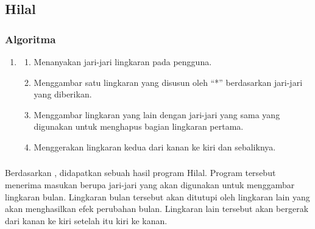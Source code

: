 \documentclass[../main.tex]{subfiles}
\begin{document}
    \subsection{Hilal}
    \subsubsection{Algoritma}
    \begin{enumerate}
        \item[]
        \begin{enumerate}
            \item{Menanyakan jari-jari lingkaran pada pengguna.}
            \item{Menggambar satu lingkaran yang disusun oleh ``*'' berdasarkan jari-jari yang diberikan.}
            \item{Menggambar lingkaran yang lain dengan jari-jari yang sama yang digunakan untuk menghapus bagian lingkaran pertama.}
            \item{Menggerakan lingkaran kedua dari kanan ke kiri dan sebaliknya.}
        \end{enumerate}
    \end{enumerate}
    \newpage
    \subsubsectionf{{\Flowchart}}
    \vspace{0.5ex}

    \subsubsection{{\Source} {\sCode}}
    \newpage
    \vspace{0.5ex}
    \begin{indentpar}
        \hspace{\parindent}Berdasarkan , didapatkan sebuah hasil program Hilal. Program tersebut menerima masukan berupa jari-jari yang akan digunakan untuk menggambar lingkaran bulan. Lingkaran bulan tersebut akan ditutupi oleh lingkaran lain yang akan menghasilkan efek perubahan bulan. Lingkaran lain tersebut akan bergerak dari kanan ke kiri setelah itu kiri ke kanan.
    \end{indentpar}
\end{document}
